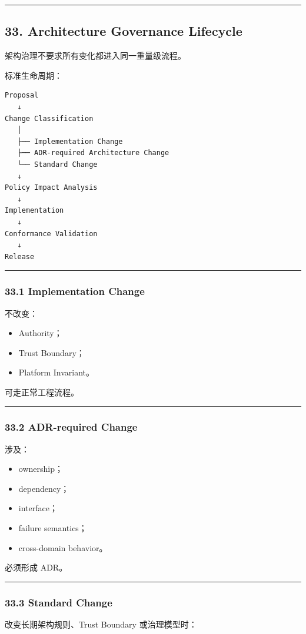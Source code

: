 \documentclass[11pt,a4paper]{article}
\begin{document}
\vspace{0.5em}\hrule\vspace{0.5em}
\subsection{33. Architecture Governance Lifecycle}
架构治理不要求所有变化都进入同一重量级流程。

标准生命周期：

\begin{lstlisting}[language=text]
Proposal
   ↓
Change Classification
   │
   ├── Implementation Change
   ├── ADR-required Architecture Change
   └── Standard Change
   ↓
Policy Impact Analysis
   ↓
Implementation
   ↓
Conformance Validation
   ↓
Release
\end{lstlisting}
\vspace{0.5em}\hrule\vspace{0.5em}
\subsubsection{33.1 Implementation Change}
不改变：

\begin{itemize}
  \item Authority；
  \item Trust Boundary；
  \item Platform Invariant。
\end{itemize}
可走正常工程流程。

\vspace{0.5em}\hrule\vspace{0.5em}
\subsubsection{33.2 ADR-required Change}
涉及：

\begin{itemize}
  \item ownership；
  \item dependency；
  \item interface；
  \item failure semantics；
  \item cross-domain behavior。
\end{itemize}
必须形成 ADR。

\vspace{0.5em}\hrule\vspace{0.5em}
\subsubsection{33.3 Standard Change}
改变长期架构规则、Trust Boundary 或治理模型时：
\end{document}

